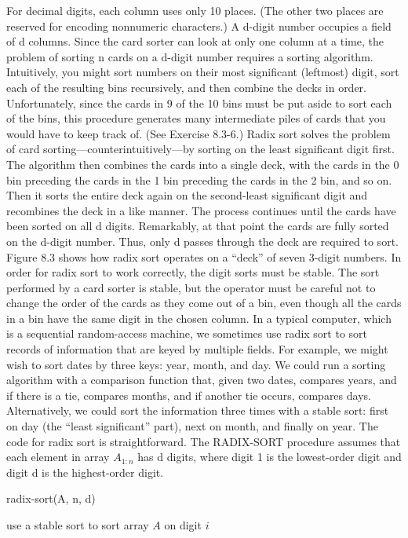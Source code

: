 For decimal digits, each column uses only 10 places. (The other two places are reserved for encoding nonnumeric characters.) A d-digit number occupies a field of d columns. Since the card sorter can look at only one column at a time, the problem of sorting n cards on a d-digit number requires a sorting algorithm.
Intuitively, you might sort numbers on their most significant (leftmost) digit, sort each of the resulting bins recursively, and then combine the decks in order. Unfortunately, since the cards in 9 of the 10 bins must be put aside to sort each of the bins, this procedure generates many intermediate piles of cards that you would have to keep track of. (See Exercise 8.3-6.)
Radix sort solves the problem of card sorting—counterintuitively—by sorting on the least significant digit first. The algorithm then combines the cards into a single deck, with the cards in the 0 bin preceding the cards in the 1 bin preceding the cards in the 2 bin, and so on. Then it sorts the entire deck again on the second-least significant digit and recombines the deck in a like manner. The process continues until the cards have been sorted on all d digits. Remarkably, at that point the cards are fully sorted on the d-digit number. Thus, only d passes through the deck are required to sort. Figure 8.3 shows how radix sort operates on a “deck” of seven 3-digit numbers.
In order for radix sort to work correctly, the digit sorts must be stable. The sort performed by a card sorter is stable, but the operator must be careful not to change the order of the cards as they come out of a bin, even though all the cards in a bin have the same digit in the chosen column.
In a typical computer, which is a sequential random-access machine, we sometimes use radix sort to sort records of information that are keyed by multiple fields. For example, we might wish to sort dates by three keys: year, month, and day. We could run a sorting algorithm with a comparison function that, given two dates, compares years, and if there is a tie, compares months, and if another tie occurs, compares days. Alternatively, we could sort the information three times with a stable sort: first on day (the “least significant” part), next on month, and finally on year.
The code for radix sort is straightforward. The RADIX-SORT procedure assumes that each element in array $A_{1 : n}$ has d digits, where digit 1 is the lowest-order digit and digit d is the highest-order digit.


\begin{algbox}{radix-sort(A, n, d)}
  \begin{algorithm}[H]
     {
        use a stable sort to sort array $A$ on digit $i$
    }
  \end{algorithm}
\end{algbox}

